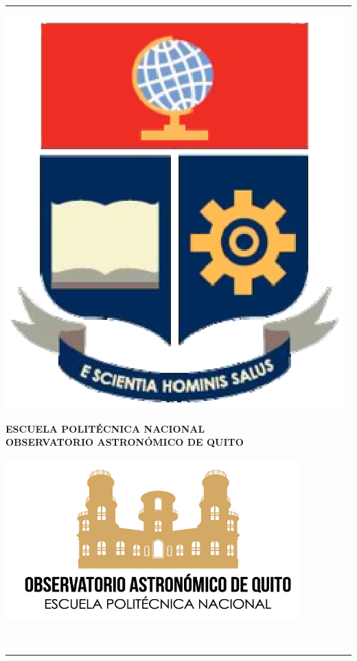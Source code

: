 \rule[0.05mm]{162mm}{0.05mm}
\begin{minipage}[d]{30mm}
\begin{center}
\includegraphics[scale=.20]{logo_epn.eps}
\end{center}
\end{minipage}
\begin{minipage}[d]{60mm}
\begin{center}
\vspace{0.2cm}
\textsf{\textbf{ ESCUELA POLIT\'ECNICA NACIONAL }}\\
\textsf{\textbf{ \small OBSERVATORIO ASTRON\'OMICO DE QUITO }}
\end{center}
\end{minipage}
\begin{minipage}[d]{30mm}
\begin{center}
\includegraphics[scale=.55]{oaq.png}
\end{center}
\end{minipage}\\
\rule[1mm]{162mm}{0.20mm}